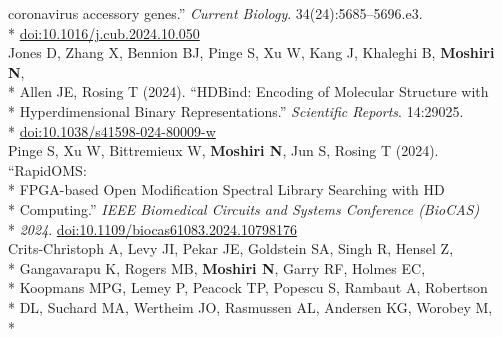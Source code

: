 \documentclass[margin,line]{res}
\begin{document}
\begin{resume}
\hspace*{9.5mm} coronavirus accessory genes.'' \textit{Current Biology}. 34(24):5685--5696.e3.\\*\vspace{2mm}
\hspace*{8mm} \href{https://doi.org/10.1016/j.cub.2024.10.050}{doi:10.1016/j.cub.2024.10.050}\\
\hspace*{4mm} Jones D, Zhang X, Bennion BJ, Pinge S, Xu W, Kang J, Khaleghi B, \textbf{Moshiri N},\\*
\hspace*{9.5mm} Allen JE, Rosing T (2024). ``HDBind: Encoding of Molecular Structure with\\*
\hspace*{9.5mm} Hyperdimensional Binary Representations.'' \textit{Scientific Reports}. 14:29025.\\*\vspace{2mm}
\hspace*{8mm} \href{https://doi.org/10.1038/s41598-024-80009-w}{doi:10.1038/s41598-024-80009-w}\\
\hspace*{4mm} Pinge S, Xu W, Bittremieux W, \textbf{Moshiri N}, Jun S, Rosing T (2024). ``RapidOMS:\\*
\hspace*{9.5mm} FPGA-based Open Modification Spectral Library Searching with HD\\*
\hspace*{9.5mm} Computing.'' \textit{IEEE Biomedical Circuits and Systems Conference (BioCAS)}\\*\vspace{2mm}
\hspace*{8mm} \textit{2024}. \href{http://doi.org/10.1109/biocas61083.2024.10798176}{doi:10.1109/biocas61083.2024.10798176}\\
\hspace*{4mm} Crits-Christoph A, Levy JI, Pekar JE, Goldstein SA, Singh R, Hensel Z,\\*
\hspace*{9.5mm} Gangavarapu K, Rogers MB, \textbf{Moshiri N}, Garry RF, Holmes EC,\\*
\hspace*{9.5mm} Koopmans MPG, Lemey P, Peacock TP, Popescu S, Rambaut A, Robertson\\*
\hspace*{9.5mm} DL, Suchard MA, Wertheim JO, Rasmussen AL, Andersen KG, Worobey M,\\*

\end{resume}
\end{document}
